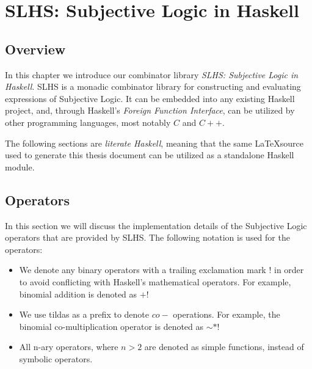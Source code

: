 \documentclass[thesis.tex]{subfiles}
\begin{document}
\chapter{SLHS: Subjective Logic in Haskell}

\section{Overview}

In this chapter we introduce our combinator library \emph{SLHS: Subjective Logic
in Haskell}. SLHS is a monadic combinator library for constructing and evaluating
expressions of Subjective Logic. It can be embedded into any existing Haskell
project, and, through Haskell's \emph{Foreign Function Interface}, can be utilized
by other programming languages, most notably $C$ and $C++$.

The following sections are \emph{literate Haskell}, meaning that the same
\LaTeX source used to generate this thesis document can be utilized as a standalone
Haskell module.

%
%






%



\section{Operators}

In this section we will discuss the implementation details of the Subjective Logic
operators that are provided by SLHS. The following notation is used for the operators:

\begin{itemize}
  \item We denote any binary operators with a trailing exclamation mark $!$ in order to
    avoid conflicting with Haskell's mathematical operators. For example, binomial addition
    is denoted as $+!$
  \item We use tildas as a prefix to denote $co-$ operations. For example, the binomial
    co-multiplication operator is denoted as $\sim *!$
  \item All n-ary operators, where $n > 2$ are denoted as simple functions, instead of
    symbolic operators.
\end{itemize}






\end{document}
